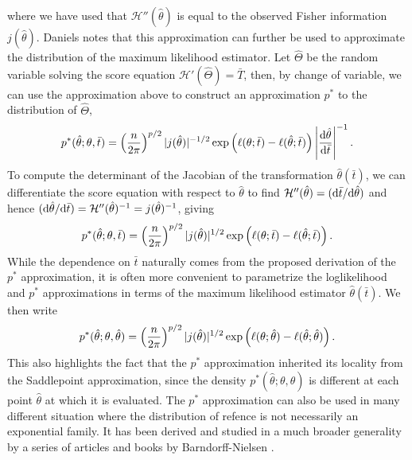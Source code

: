 where we have used that $\mathcal{H}''(\hat\theta)$ is equal to the observed Fisher information $j(\hat\theta)$. Daniels \cite{daniels1958} notes that this approximation can further be used to approximate the distribution of the maximum likelihood estimator. Let $\hat\Theta$ be the random variable solving the score equation $\mathcal{H}'(\hat\Theta) = \bar T$, then, by change of variable, we can use the approximation above to construct an approximation $p^*$ to the distribution of $\hat\Theta$,
\begin{equation*}
    p^*(\hat\theta; \theta, \bar t) = \left(\frac{n}{2\pi}\right)^{p/2}|j(\hat\theta)|^{-1/2} \exp\left(\ell(\theta; \bar t) - \ell(\hat\theta; \bar t)\right) \left|\frac{\text{d} \hat\theta}{\text{d} \bar t}\right|^{-1}.
\end{equation*}
To compute the determinant of the Jacobian of the transformation $\hat\theta(\bar t)$, we can differentiate the score equation with respect to $\hat\theta$ to find $\mathcal{H}''(\hat\theta) = (\text{d} \bar t / \text{d} \hat\theta)$ and hence $(\text{d} \hat\theta / \text{d} \bar t) = \mathcal{H}''(\hat\theta)^{-1} = j(\hat\theta)^{-1}$, giving
\begin{equation} \label{eq-pstar}
    p^*(\hat\theta; \theta, \bar t) = \left(\frac{n}{2\pi}\right)^{p/2}|j(\hat\theta)|^{1/2} \exp\left(\ell(\theta; \bar t) - \ell(\hat\theta; \bar t)\right).
\end{equation}
While the dependence on $\bar t$ naturally comes from the proposed derivation of the $p^*$ approximation, it is often more convenient to parametrize the loglikelihood and $p^*$ approximations in terms of the maximum likelihood estimator $\hat\theta(\bar t)$. We then write
\begin{equation*}
    p^*(\hat\theta; \theta, \hat\theta) = \left(\frac{n}{2\pi}\right)^{p/2}|j(\hat\theta)|^{1/2} \exp\left(\ell(\theta; \hat\theta) - \ell(\hat\theta; \hat\theta)\right).
\end{equation*}
This also highlights the fact that the $p^*$ approximation inherited its locality from the Saddlepoint approximation, since the density $p^*(\hat\theta; \theta, \hat\theta)$ is different at each point $\hat\theta$ at which it is evaluated. The $p^*$ approximation can also be used in many different situation where the distribution of refence is not necessarily an exponential family. It has been derived and studied in a much broader generality by a series of articles and books by Barndorff-Nielsen \cite{BarndorffNielsen1980,BarndorffNielsen1983}.  

